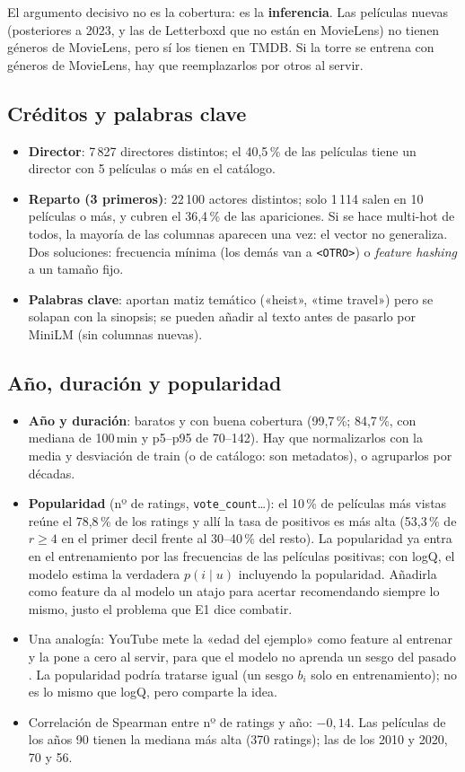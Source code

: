 \documentclass[a4paper,11pt]{article}
\begin{document}
El argumento decisivo no es la cobertura: es la \textbf{inferencia}. Las películas nuevas (posteriores a 2023, y las
de Letterboxd que no están en MovieLens) no tienen géneros de MovieLens, pero sí los tienen en TMDB. Si la torre se
entrena con géneros de MovieLens, hay que reemplazarlos por otros al servir.

\subsection{Créditos y palabras clave}
\begin{itemize}
  \item \textbf{Director}: 7\,827 directores distintos; el 40,5\,\% de las películas tiene un director con 5 películas o más en el catálogo.
  \item \textbf{Reparto (3 primeros)}: 22\,100 actores distintos; solo 1\,114 salen en 10 películas o más, y cubren el 36,4\,\% de
        las apariciones. Si se hace multi-hot de todos, la mayoría de las columnas aparecen una vez: el vector no generaliza.
        Dos soluciones: frecuencia mínima (los demás van a \texttt{<OTRO>}) o \emph{feature hashing} a un tamaño fijo.
  \item \textbf{Palabras clave}: aportan matiz temático («heist», «time travel») pero se solapan con la sinopsis; se pueden añadir
        al texto antes de pasarlo por MiniLM (sin columnas nuevas).
\end{itemize}

\subsection{Año, duración y popularidad}
\begin{itemize}
  \item \textbf{Año y duración}: baratos y con buena cobertura (99,7\,\%; 84,7\,\%, con mediana de 100\,min y p5--p95 de 70--142). Hay que
        normalizarlos con la media y desviación de train (o de catálogo: son metadatos), o agruparlos por décadas.
  \item \textbf{Popularidad} (nº de ratings, \texttt{vote\_count}\dots): el 10\,\% de películas más vistas reúne el 78,8\,\% de los
        ratings y allí la tasa de positivos es más alta (53,3\,\% de $r\ge4$ en el primer decil frente al 30--40\,\% del resto).
        La popularidad ya entra en el entrenamiento por las frecuencias de las películas positivas; con logQ, el modelo estima
        la verdadera $p(i\mid u)$ incluyendo la popularidad. Añadirla como feature da al modelo un atajo para acertar
        recomendando siempre lo mismo, justo el problema que E1 dice combatir.
  \item Una analogía: YouTube mete la «edad del ejemplo» como feature al entrenar y la pone a cero al servir, para que el modelo
        no aprenda un sesgo del pasado \cite{covington2016}. La popularidad podría tratarse igual (un sesgo $b_i$ solo en
        entrenamiento); no es lo mismo que logQ, pero comparte la idea.
  \item Correlación de Spearman entre nº de ratings y año: $-0{,}14$. Las películas de los años 90 tienen la mediana más alta (370 ratings);
        las de los 2010 y 2020, 70 y 56.
\end{itemize}
\end{document}
